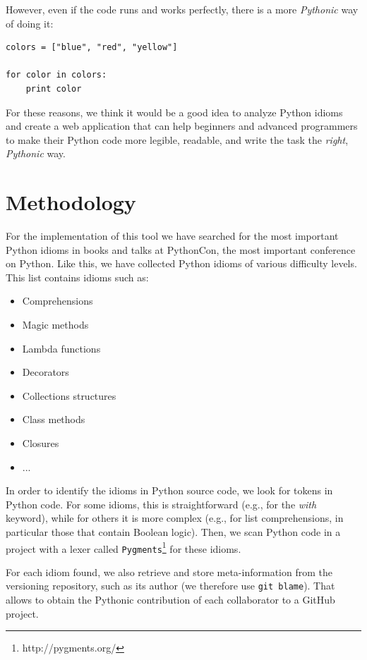 \documentclass[a4paper]{article}
\begin{document}
However, even if the code runs and works perfectly, there is a more \emph{Pythonic} way of
doing it:

\begin{verbatim}
colors = ["blue", "red", "yellow"]

for color in colors:
    print color
\end{verbatim}

For these reasons, we think it would be a good idea to analyze Python idioms and create a web application that can help beginners and advanced programmers to make their Python code more legible, readable, and write the task the \emph{right}, \emph{Pythonic} way.

\section{Methodology}

For the implementation of this tool we have searched for the most important Python idioms in books and talks at PythonCon, the most important conference on Python. Like this, we have collected Python idioms of various difficulty levels. This list contains idioms such as:

\begin{itemize}
\item Comprehensions
\item Magic methods
\item Lambda functions
\item Decorators
\item Collections structures
\item Class methods
\item Closures
\item ...
\end{itemize}

In order to identify the idioms in Python source code, we look for tokens in Python code. For some idioms, this is straightforward (e.g., for the \emph{with} keyword), while for others it is more complex (e.g., for list comprehensions, in particular those that contain Boolean logic). Then, we scan Python code in a project with a lexer called \texttt{Pygments}\footnote{http://pygments.org/} for these idioms.

For each idiom found, we also retrieve and store meta-information from the versioning repository, such as its author (we therefore use \texttt{git blame}). That allows to obtain the Pythonic contribution of each collaborator to a GitHub project.
\end{document}

